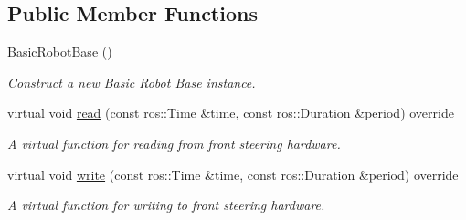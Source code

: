 \subsection*{Public Member Functions}
\begin{DoxyCompactItemize}
\item 
\mbox{\label{classBasicRobotBase_a394ebe25d0c3292f7d9835a84d685a86}} 
\hyperlink{classBasicRobotBase_a394ebe25d0c3292f7d9835a84d685a86}{Basic\+Robot\+Base} ()
\begin{DoxyCompactList}\small\item\em Construct a new Basic Robot Base instance. \end{DoxyCompactList}\item 
virtual void \hyperlink{classBasicRobotBase_a64bb2c7bed72e98fb62a37d6beb4fe5a}{read} (const ros\+::\+Time \&time, const ros\+::\+Duration \&period) override
\begin{DoxyCompactList}\small\item\em A virtual function for reading from front steering hardware. \end{DoxyCompactList}\item 
virtual void \hyperlink{classBasicRobotBase_afbc6ef4347fc05e053391692a9e1bc24}{write} (const ros\+::\+Time \&time, const ros\+::\+Duration \&period) override
\begin{DoxyCompactList}\small\item\em A virtual function for writing to front steering hardware. \end{DoxyCompactList}\end{DoxyCompactItemize}
